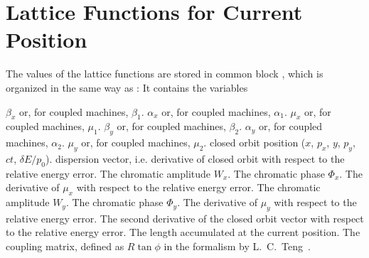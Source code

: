 \section{Lattice Functions for Current Position}
\label{Sopt1}
The values of the lattice functions are stored in common block
,
which is organized in the same way as :
It contains the variables
\begin{mylist}
$\beta_x$ or, for coupled machines, $\beta_1$.
$\alpha_x$ or, for coupled machines, $\alpha_1$.
$\mu_x$ or, for coupled machines, $\mu_1$.
$\beta_y$ or, for coupled machines, $\beta_2$.
$\alpha_y$ or, for coupled machines, $\alpha_2$.
$\mu_y$ or, for coupled machines, $\mu_2$.
closed orbit position ($x$, $p_x$, $y$, $p_y$, $ct$, $\delta E/p_0$).
dispersion vector, i.e. derivative of closed orbit with respect to
the relative energy error.
The chromatic amplitude $W_x$.
The chromatic phase $\Phi_x$.
The derivative of $\mu_x$ with respect to the relative energy error.
The chromatic amplitude $W_y$.
The chromatic phase $\Phi_y$.
The derivative of $\mu_y$ with respect to the relative energy error.
The second derivative of the closed orbit vector with respect to
the relative energy error.
The length accumulated at the current position.
The coupling matrix,
defined as $R \tan \phi$ in the formalism by L.~C.~Teng~\cite{TENG}.
\end{mylist}
 
